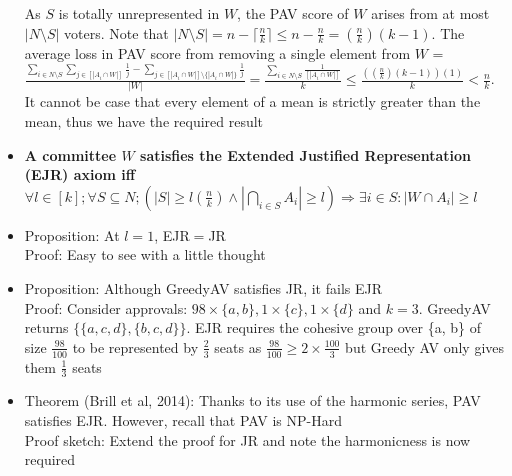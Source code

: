 \documentclass[20pt,a4paper,landscape]{extarticle}
\begin{document}
\begin{flushleft}
\begin{itemize}
As $S$ is totally unrepresented in $W$, the PAV score of $W$ arises from at most $|N \setminus S|$ voters. Note that $|N \setminus S| = n - \lceil \frac{n}{k} \rceil \leq n - \frac{n}{k} = (\frac{n}{k})(k-1)$. The average loss in PAV score from removing a single element from $W$ = $\frac{\sum_{i \in N \setminus S} \sum_{j \in [|A_i \cap W|]} \frac{1}{j} - \sum_{j \in [|A_i \cap W|]\setminus \{|A_i \cap W|\}} \frac{1}{j}}{|W|} = \frac{\sum_{i \in N \setminus S} \frac{1}{[|A_i \cap W|]}}{k} \leq \frac{((\frac{n}{k})(k-1))(1)}{k} < \frac{n}{k}$. It cannot be case that every element of a mean is strictly greater than the mean, thus we have the required result
\item \textbf{A committee $W$ satisfies the Extended Justified Representation (EJR) axiom iff $\forall l \in [k]; \forall S \subseteq N; (|S| \geq l\left(\frac{n}{k}\right) \land |\bigcap_{i \in S} A_i| \geq l) \Rightarrow \exists i \in S: |W \cap A_i| \geq l$}
\item Proposition: At $l=1$, EJR$=$JR\\
Proof: Easy to see with a little thought
\item Proposition: Although GreedyAV satisfies JR, it fails EJR\\
Proof: Consider approvals: $98 \times \{a, b\}, 1 \times \{c\}, 1 \times \{d\}$ and $k = 3$. GreedyAV returns $\{\{a, c, d\}, \{b, c, d\}\}$. EJR requires the cohesive group over \{a, b\} of size $\frac{98}{100}$ to be represented by $\frac{2}{3}$ seats as $\frac{98}{100} \geq 2 \times \frac{100}{3}$ but Greedy AV only gives them $\frac{1}{3}$ seats
\item Theorem (Brill et al, 2014): Thanks to its use of the harmonic series, PAV satisfies EJR. However, recall that PAV is NP-Hard\\
Proof sketch: Extend the proof for JR and note the harmonicness is now required
\end{itemize}
\end{flushleft}
\end{document}
